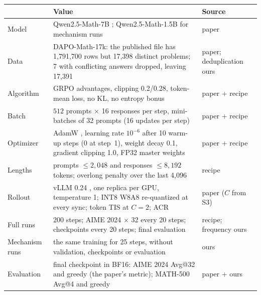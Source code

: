 \documentclass[11pt]{article}
\begin{document}
\begin{center}\small
\begin{tabularx}{\linewidth}{@{}l L l@{}}
\toprule
& Value & Source\\
\midrule
Model & Qwen2.5-Math-7B \citep{yang2024qwen25math}; Qwen2.5-Math-1.5B for mechanism runs & paper\\
Data & DAPO-Math-17k: the published file has 1{,}791{,}700 rows but 17{,}398 distinct problems; 7 with conflicting answers dropped, leaving 17{,}391 & paper; deduplication ours\\
Algorithm & GRPO advantages, clipping 0.2/0.28, token-mean loss, no KL, no entropy bonus \citep{yu2025dapo} & paper + recipe\\
Batch & $512$ prompts $\times$ 16 responses per step, mini-batches of 32 prompts (16 updates per step) & paper + recipe\\
Optimizer & AdamW \citep{loshchilov2019adamw}, learning rate $10^{-6}$ after 10 warm-up steps (0 at step~1), weight decay 0.1, gradient clipping 1.0, FP32 master weights & paper + recipe\\
Lengths & prompts $\le2{,}048$ and responses $\le8{,}192$ tokens; overlong penalty over the last 4{,}096 & recipe\\
Rollout & vLLM 0.24 \citep{kwon2023vllm}, one replica per GPU, temperature 1; INT8 W8A8 re-quantized at every sync; token TIS at $C=2$; ACR & paper ($C$ from S3)\\
Full runs & 200 steps; AIME 2024 $\times$ 32 every 20 steps; checkpoints every 20 steps; final evaluation & recipe; frequency ours\\
Mechanism runs & the same training for 25 steps, without validation, checkpoints or evaluation & ours\\
Evaluation & final checkpoint in BF16: AIME 2024 Avg@32 and greedy (the paper's metric); MATH-500 Avg@4 and greedy & paper + ours\\
\bottomrule
\end{tabularx}
\end{center}
\end{document}
